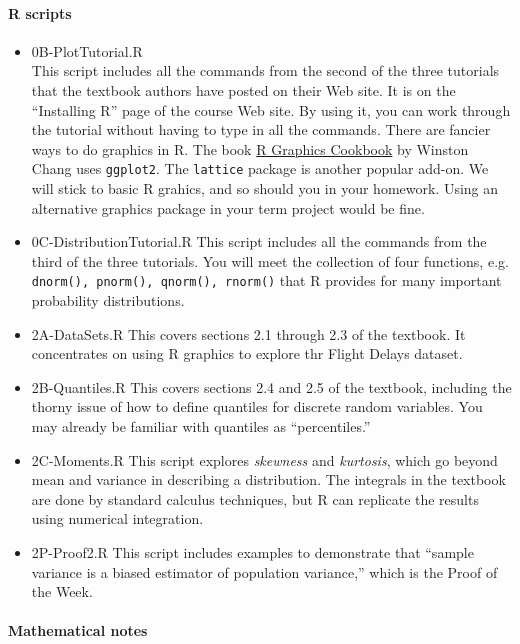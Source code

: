 \documentclass[12pt]{article}
\begin{document}
\pagebreak


\paragraph*{R scripts}
\begin{itemize}
\item 0B-PlotTutorial.R\\
This script includes all the commands from the second of the three tutorials that the textbook authors have posted on their Web site. It is on the ``Installing R'' page of the course Web site. By using it, you can work through the tutorial without having to type in all the commands.
There are fancier ways to do graphics in R. The book \underline {R Graphics Cookbook} by Winston Chang uses \verb!ggplot2!. The \verb!lattice! package is another popular add-on. We will stick to basic R grahics, and so should you in your homework. Using an alternative graphics package in your term project would be fine.

\item 0C-DistributionTutorial.R
This script includes all the commands from the third of the three tutorials. You will meet the collection of four functions, e.g. \verb!dnorm(), pnorm(), qnorm(), rnorm()! that R provides for many important probability distributions.

\item 2A-DataSets.R This covers sections 2.1 through 2.3 of the textbook. It concentrates on using R graphics to explore thr Flight Delays dataset.
\item 2B-Quantiles.R This covers sections 2.4 and 2.5 of the textbook, including the thorny issue of how to define quantiles for discrete random variables. You may already be familiar with quantiles as ``percentiles.''
\item 2C-Moments.R This script explores \emph{skewness} and \emph{kurtosis}, which go beyond mean and variance in describing a distribution. The integrals in the textbook are done by standard calculus techniques, but R can replicate the results using numerical integration.
\item 2P-Proof2.R This script includes examples to demonstrate that ``sample variance is a biased estimator of population variance,'' which is the Proof of the Week.
\end{itemize}

\pagebreak





\paragraph*{Mathematical notes}
\end{document}
